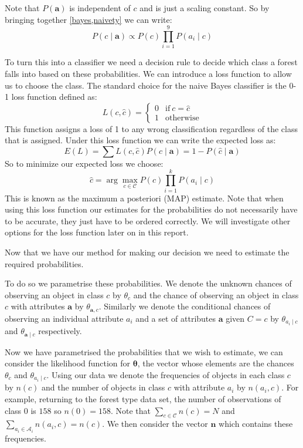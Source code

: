 Note that $P(\mathbf{a})$ is independent of $c$ and is just a scaling constant.
So by bringing together \cref{bayes,naivety} we can write:
\begin{equation}
	P(c \mid \mathbf{a}) \propto P(c)\prod_{i=1}^{9}P(a_i \mid c)
\end{equation}

To turn this into a classifier we need a decision rule to decide which class a forest falls into based on these probabilities.
We can introduce a loss function to allow us to choose the class.
The standard choice for the naive Bayes classifier is the 0-1 loss function \cite{Rish01} defined as:
\begin{equation}\label{0-1_loss_function}
	L(c, \hat{c}) = 
	\begin{cases}
		0 & \text{if}\ c = \hat{c} \\
		1 & \text{otherwise}
	\end{cases}
\end{equation}
This function assigns a loss of 1 to any wrong classification regardless of the class that is assigned. 
Under this loss function we can write the expected loss as:
\begin{equation}
	E(L) = \sum L(c, \hat{c})P(c \mid \mathbf{a}) = 1 - P(\hat{c} \mid \mathbf{a})
\end{equation}
So to minimize our expected loss we choose:
\begin{equation} \label{map_estimate}
	\hat c = \arg\max_{c \in \mathcal{C}} P(c)\prod_{i=1}^{k}P(a_i \mid c)
\end{equation}
This is known as the maximum a posteriori (MAP) estimate.
Note that when using this loss function our estimates for the probabilities do not necessarily have to be accurate, they just have to be ordered correctly.
We will investigate other options for the loss function later on in this report.

Now that we have our method for making our decision we need to estimate the required probabilities.

To do so we parametrise these probabilities.
We denote the unknown chances of observing an object in class $c$ by $\theta_c$ and the chance of observing an object in class $c$ with attributes $\mathbf{a}$ by $\theta_{\mathbf{a}, c}$.
Similarly we denote the conditional chances of observing an individual attribute $a_i$ and a set of attributes $\mathbf{a}$ given $C=c$ by $\theta_{a_i \mid c}$ and $\theta_{\mathbf{a} \mid c}$ respectively.

Now we have parametrised the probabilities that we wish to estimate, we can consider the likelihood function for $\mathbf{\theta}$, the vector whose elements are the chances $\theta_{c}$ and $\theta_{a_i \mid c}$.
Using our data we denote the frequencies of objects in each class $c$ by $n(c)$ and the number of objects in class $c$ with attribute $a_i$ by $n(a_i, c)$.
For example, returning to the forest type data set, the number of observations of class $0$ is $158$ so $n(0) = 158$.
Note that $\sum_{c \in \mathcal{C}}n(c) = N$ and $\sum_{a_i \in \mathcal{A}_i}n(a_i, c) = n(c)$.
We then consider the vector $\mathbf{n}$ which contains these frequencies.

